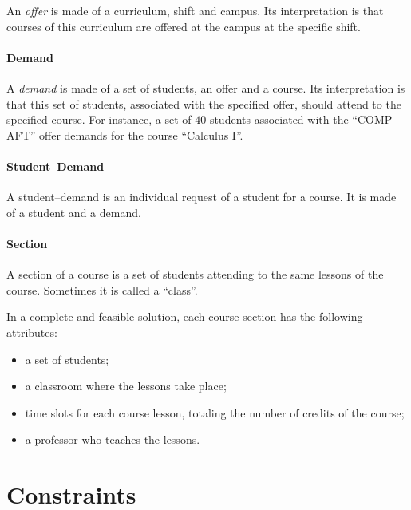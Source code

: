 An \textit{offer} is made of a curriculum, shift and campus. Its interpretation is that courses of this curriculum are offered at the campus at the specific shift.


\paragraph{Demand}
 \label{defdem}

A \textit{demand} is made of a set of students, an offer and a course. Its interpretation is that this set of students, associated with the specified offer, should attend to the specified course.
For instance, a set of $40$ students associated with the ``COMP-AFT'' offer demands for the course ``Calculus I''.


\paragraph{Student--Demand}
\label{defstdem}

A student--demand is an individual request of a student for a course. It is made of a student and a demand.



\paragraph{Section}
\label{defsection}

A section of a course is a set of students attending to the same lessons of the course. Sometimes it is called a ``class''.

In a complete and feasible solution, each course section has the following attributes:
\begin{itemize}
\item a set of students;
\item a classroom where the lessons take place;
\item time slots for each course lesson, totaling the number of credits of the course;
\item a professor who teaches the lessons.
\end{itemize}





\pagebreak

\section{Constraints}
\label{sec:allconstr}

